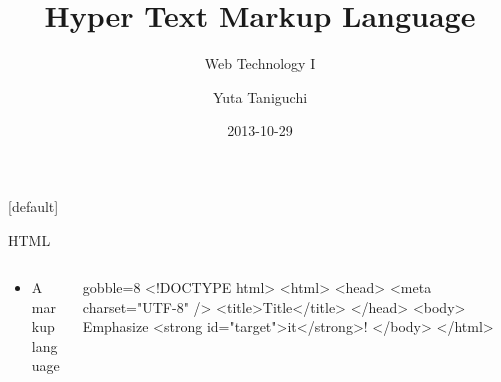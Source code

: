 \documentclass[14pt]{beamer}
\title{Hyper Text Markup Language}
\subtitle{Web Technology I}
\author{Yuta Taniguchi}
\institute{@yuttieyuttie}
\date{2013-10-29}
\begin{document}
{%
  [default]
  \frame{\titlepage}
}
\setcounter{framenumber}{0}


\begin{frame}[fragile]{HTML}
  \begin{columns}
    \begin{column}{0.4\textwidth}
      \begin{itemize}
        \item A markup language
      \end{itemize}
    \end{column}
    \begin{column}{0.6\textwidth}
      \begin{html*}{gobble=8}
        <!DOCTYPE html>
        <html>
          <head>
            <meta charset="UTF-8" />
            <title>Title</title>
          </head>
          <body>
            Emphasize
            <strong id="target">it</strong>!
          </body>
        </html>
      \end{html*}
    \end{column}
  \end{columns}
\end{frame}
\end{document}
